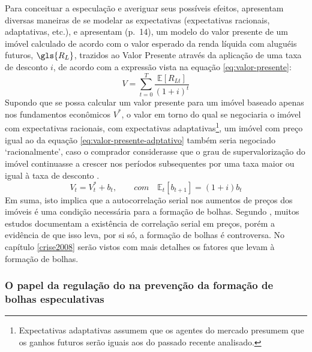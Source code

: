 \documentclass[
	12pt,				%
	oneside,			%
	a4paper,			%
	chapter=TITLE,		%
	section=TITLE,		%
	english,			%
	brazil				%
	]{abntex2}
\begin{document}
\begin{refsection}
Para conceituar a especulação e averiguar seus possíveis efeitos,
\textcite[p.~12]{Malpezzi2002TheRO} apresentam diversas maneiras de se modelar as
expectativas (expectativas racionais, adaptativas, etc.), e apresentam (p.~14),
um modelo do valor presente de um imóvel calculado de acordo com o valor
esperado da renda líquida com aluguéis futuros, \(\gls{R_L}\), trazidos ao Valor
Presente através da aplicação de uma taxa de desconto \(i\), de acordo com a
expressão vista na equação \eqref{eq:valor-presente}:
\begin{equation}
V = \sum_{t = 0}^T \frac{\mathbb{E}[R_{Lt}]}{(1+i)^t}
\label{eq:valor-presente}
\end{equation}
Supondo que se possa calcular um valor presente para um imóvel baseado apenas
nos fundamentos econômicos \(V^*\), o valor em torno do qual se negociaria o
imóvel com expectativas racionais, com expectativas adaptativas\footnote{Expectativas adaptativas assumem que os agentes do mercado presumem que os
  ganhos futuros serão iguais aos do passado recente analisado.}, um imóvel
com preço igual ao da equação \eqref{eq:valor-presente-adptativo} também seria
negociado `racionalmente', caso o comprador considerasse que o grau de
supervalorização do imóvel continuasse a crescer nos períodos subsequentes por
uma taxa maior ou igual à taxa de desconto \autocite[15]{Malpezzi2002TheRO}.
\begin{equation}
V_t = V_t^* + b_t, \qquad com \quad \mathbb{E}_t[b_{t+1}] = (1+i)b_t
\label{eq:valor-presente-adptativo}
\end{equation}
Em suma, isto implica que a autocorrelação serial nos aumentos de preços dos
imóveis é uma condição necessária para a formação de bolhas. Segundo
\textcite[p.~15]{Malpezzi2002TheRO}, muitos estudos documentam a existência de correlação
serial em preços, porém a evidência de que isso leva, por si só, a formação de
bolhas é controversa. No capítulo \ref{crise2008} serão vistos com mais detalhes os
fatores que levam à formação de bolhas.

\hypertarget{o-papel-da-regulauxe7uxe3o-do-na-prevenuxe7uxe3o-da-formauxe7uxe3o-de-bolhas-especulativas}{%
\subsubsection{\texorpdfstring{O papel da regulação do  na prevenção da formação de bolhas especulativas}{O papel da regulação do  na prevenção da formação de bolhas especulativas}}\label{o-papel-da-regulauxe7uxe3o-do-na-prevenuxe7uxe3o-da-formauxe7uxe3o-de-bolhas-especulativas}}


\end{refsection}
\end{document}
